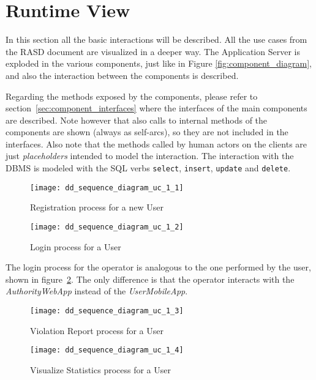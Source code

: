 \section{Runtime View}
In this section all the basic interactions will be described. All the use cases
from the RASD document are visualized in a deeper way. The Application Server is
exploded in the various components, just like in Figure
\ref{fig:component_diagram}, and also the interaction between the components is
described.

Regarding the methods exposed by the components, please refer to
section~\ref{sec:component_interfaces} where the interfaces of the main
components are described. Note however that also calls to internal methods of
the components are shown (always as self-arcs), so they are not included in the
interfaces.
Also note that the methods called by human actors on the clients are just
\emph{placeholders} intended to model the interaction.
The interaction with the DBMS is modeled with the SQL verbs \texttt{select},
\texttt{insert}, \texttt{update} and \texttt{delete}.

\begin{figure}[ht]
    \centering
    \texttt{[image: dd\_sequence\_diagram\_uc\_1\_1]}
    \caption{Registration process for a new User}
    \label{fig:dd_sequence_diagram_uc_1_1}
\end{figure}

\clearpage

\begin{figure}[ht]
    \centering
    \texttt{[image: dd\_sequence\_diagram\_uc\_1\_2]}
    \caption{Login process for a User}
    \label{fig:dd_sequence_diagram_uc_1_2}
\end{figure}

The login process for the operator is analogous to the one performed
by the user, shown in figure~\ref{fig:dd_sequence_diagram_uc_1_2}.
The only difference is that the operator interacts with the
\emph{AuthorityWebApp} instead of the \emph{UserMobileApp}.


\begin{figure}[ht]
    \centering
    \texttt{[image: dd\_sequence\_diagram\_uc\_1\_3]}
    \caption{Violation Report process for a User}
    \label{fig:dd_sequence_diagram_uc_1_3}
\end{figure}

\clearpage

\begin{figure}[ht]
    \centering
    \texttt{[image: dd\_sequence\_diagram\_uc\_1\_4]}
    \caption{Visualize Statistics process for a User}
    \label{fig:dd_sequence_diagram_uc_1_4}
\end{figure}

